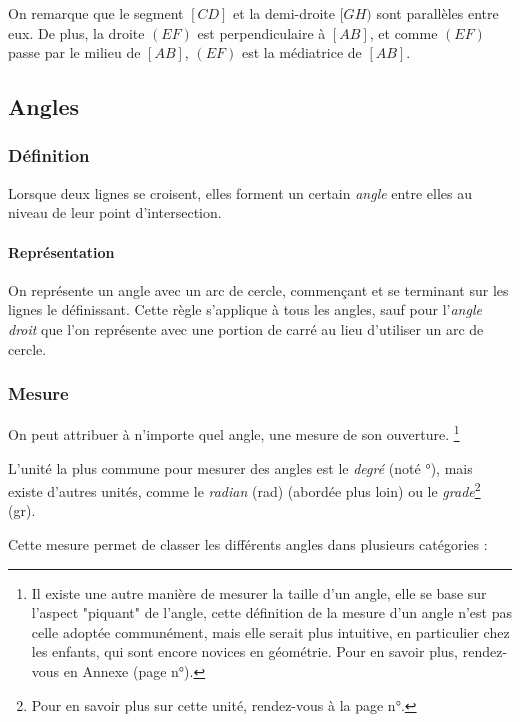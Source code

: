 \documentclass[a4paper, twoside]{article}
\begin{document}
On remarque que le segment $[CD]$ et la demi-droite $[GH)$ sont parallèles entre eux.
De plus, la droite $(EF)$ est perpendiculaire à $[AB]$, et comme $(EF)$ passe par le milieu de $[AB]$,
$(EF)$ est la médiatrice de $[AB]$.

\newpage

\subsection{Angles}

\subsubsection*{Définition}

Lorsque deux lignes se croisent, elles forment un certain \emph{angle} entre elles au niveau de leur point d'intersection.

\paragraph*{Représentation}
On représente un angle avec un arc de cercle, commençant et se terminant sur les lignes le définissant.
Cette règle s'applique à tous les angles, sauf pour l'\emph{angle droit}
que l'on représente avec une portion de carré au lieu d'utiliser un arc de cercle.

\subsubsection*{Mesure}

On peut attribuer à n'importe quel angle, une mesure de son ouverture.
\footnote{Il existe une autre manière de mesurer la taille d'un angle,
	elle se base sur l'aspect "piquant" de l'angle,
	cette définition de la mesure d'un angle n'est pas celle adoptée communément,
	mais elle serait plus intuitive, en particulier chez les enfants, qui sont encore novices en géométrie.
	Pour en savoir plus, rendez-vous en Annexe (page n°\pageref{autre_def_angle}).}

L'unité la plus commune pour mesurer des angles est le \emph{degré} (noté °),
mais existe d'autres unités, comme le \emph{radian} (rad) (abordée plus loin)
ou le \emph{grade}\footnote{Pour en savoir plus sur cette unité, rendez-vous à la page n°\pageref{grade}.} (gr).

Cette mesure permet de classer les différents angles dans plusieurs catégories :

\vspace{-0.4cm}
\end{document}
